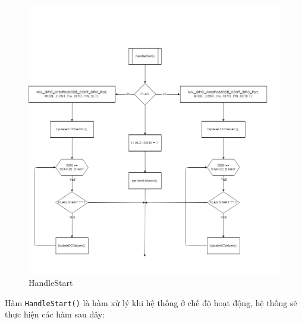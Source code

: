 \begin{figure}[H]
	\centering
	\includegraphics[width=\linewidth]{./diagram/handleStart.png}
	\caption{HandleStart}
	\label{f_handlestart}
\end{figure}

Hàm \texttt{HandleStart()} là hàm xử lý khi hệ thống ở chế độ hoạt động, hệ thống sẽ thực hiện các hàm sau đây:

